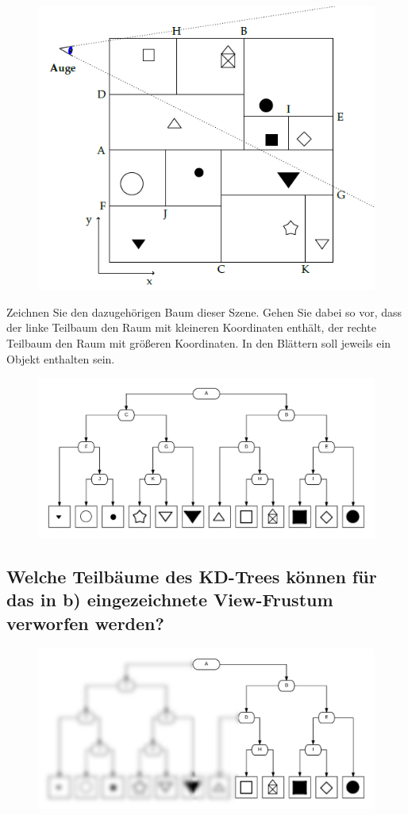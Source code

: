 \documentclass[a4paper,10pt,DIV=14]{scrartcl}
\begin{document}
\begin{figure}[!htbp]
	\centering
	\includegraphics[]{scene}
\end{figure}

Zeichnen Sie den dazugehörigen Baum dieser Szene. Gehen Sie dabei so vor, dass der linke Teilbaum den Raum mit kleineren Koordinaten enthält, der rechte Teilbaum den Raum mit größeren Koordinaten. In den Blättern soll jeweils ein Objekt enthalten sein.

\begin{figure}[!htbp]
	\centering
	\includegraphics[width=1\linewidth]{kd}
\end{figure}

\newpage
\subsection{Welche Teilbäume des KD-Trees können für das in b) eingezeichnete View-Frustum verworfen werden?}

\begin{figure}[!htbp]
	\centering
	\includegraphics[width=1\linewidth]{kd_blur}
\end{figure}
\end{document}
